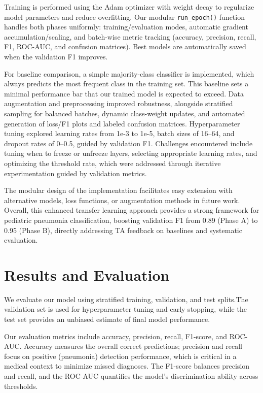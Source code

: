 \documentclass[11pt]{article}
\begin{document}
Training is performed using the Adam optimizer with weight decay to regularize model parameters 
and reduce overfitting. Our modular \texttt{run\_epoch()} function handles both phases uniformly: 
training/evaluation modes, automatic gradient accumulation/scaling, and batch-wise metric tracking 
(accuracy, precision, recall, F1, ROC-AUC, and confusion matrices). Best models are automatically 
saved when the validation F1 improves.


For baseline comparison, a simple majority-class classifier is implemented, which always predicts the most frequent class in the training set. This baseline sets a minimal performance bar that our trained model is expected to exceed.
Data augmentation and preprocessing improved robustness, alongside stratified sampling for balanced batches, dynamic class-weight updates, and automated generation of loss/F1 plots and labeled confusion matrices. Hyperparameter tuning explored learning rates from 1e-3 to 1e-5, batch sizes of 16–64, and dropout rates of 0–0.5, guided by validation F1. Challenges encountered include tuning when to freeze or unfreeze layers, selecting appropriate learning rates, and optimizing the threshold rate, which were addressed through iterative experimentation guided by validation metrics.

The modular design of the implementation facilitates easy extension with alternative models, loss functions, or augmentation methods in future work. Overall, this enhanced transfer learning approach provides a strong framework for pediatric pneumonia
classification, boosting validation F1 from 0.89 (Phase A) to 0.95 (Phase B), directly addressing TA feedback on baselines and systematic evaluation.



\section{Results and Evaluation}


We evaluate our model using stratified training, validation, and test splits.The validation set is used for hyperparameter tuning and early stopping, while the test set provides an unbiased estimate of final model performance.

Our evaluation metrics include accuracy, precision, recall, F1-score, and ROC-AUC. Accuracy measures the overall correct predictions; precision and recall focus on positive (pneumonia) detection performance, which is critical in a medical context to minimize missed diagnoses. 
The F1-score balances precision and recall, and the ROC-AUC quantifies the model’s discrimination ability across thresholds.
\end{document}
